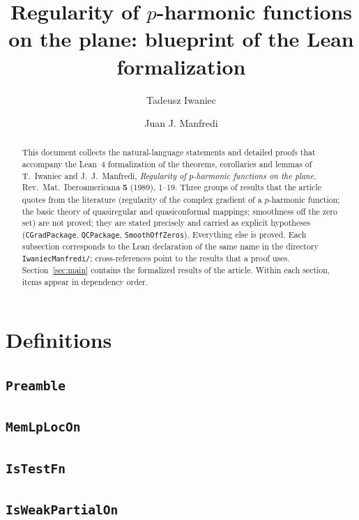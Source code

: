 \documentclass[11pt]{amsart}
\title[Blueprint of the Lean formalization]{Regularity of $p$-harmonic functions on the plane: blueprint of the Lean formalization}
\author{Tadeusz Iwaniec}
\author{Juan J. Manfredi}
\theoremstyle{definition}
\begin{document}
\begin{abstract}
This document collects the natural-language statements and detailed proofs that accompany the Lean~4 formalization of the theorems, corollaries and lemmas of T.~Iwaniec and J.~J.~Manfredi, \emph{Regularity of $p$-harmonic functions on the plane}, Rev.\ Mat.\ Iberoamericana \textbf{5} (1989), 1--19.
Three groups of results that the article quotes from the literature (regularity of the complex gradient of a $p$-harmonic function; the basic theory of quasiregular and quasiconformal mappings; smoothness off the zero set) are not proved; they are stated precisely and carried as explicit hypotheses (\texttt{CGradPackage}, \texttt{QCPackage}, \texttt{SmoothOffZeros}). Everything else is proved.
Each subsection corresponds to the Lean declaration of the same name in the directory \texttt{IwaniecManfredi/}; cross-references point to the results that a proof uses.
Section~\ref{sec:main} contains the formalized results of the article.
Within each section, items appear in dependency order.
\end{abstract}
\maketitle
\tableofcontents

\section{Definitions}
\subsection{\texorpdfstring{\texttt{Preamble}}{Preamble}}\label{node:Preamble}


\subsection{\texorpdfstring{\texttt{MemLpLocOn}}{MemLpLocOn}}\label{node:MemLpLocOn}


\subsection{\texorpdfstring{\texttt{IsTestFn}}{IsTestFn}}\label{node:IsTestFn}


\subsection{\texorpdfstring{\texttt{IsWeakPartialOn}}{IsWeakPartialOn}}\label{node:IsWeakPartialOn}

\end{document}
